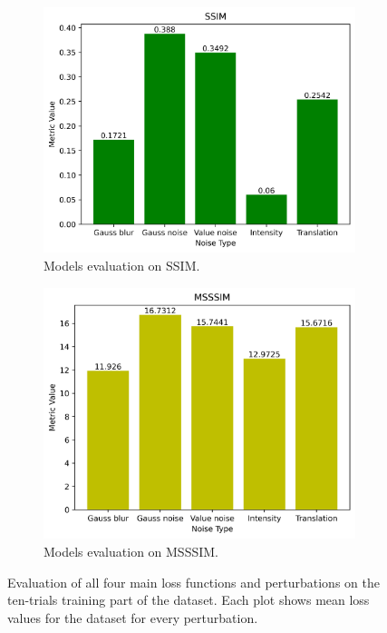 \begin{figure}[H]
\begin{subfigure}[t]{0.45\textwidth}
    \centering
    \includegraphics[width=\linewidth]{img/ten-trials/losses/augmentation_SSIM.png}
    \caption{Models evaluation on SSIM.}
  \end{subfigure}
  \begin{subfigure}[t]{0.45\textwidth}
    \centering
    \includegraphics[width=\linewidth]{img/ten-trials/losses/augmentation_MSSSIM.png}
    \caption{Models evaluation on MSSSIM.}
  \end{subfigure}
\caption{Evaluation of all four main loss functions and perturbations on the ten-trials training part of the dataset. Each plot shows mean loss values for the dataset for every perturbation.}
\label{img:experiments:losses:evaluation-on-dataset:losses}
\end{figure}

